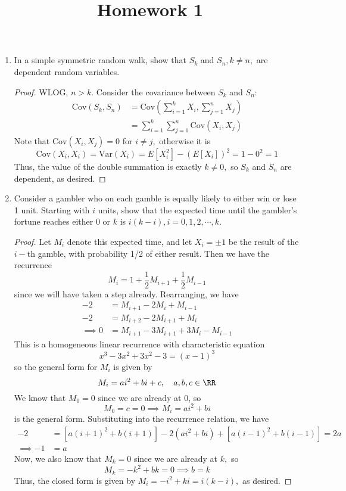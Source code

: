 \documentclass{article}
\newcommand{\var}{\mathrm{Var}}
\newcommand{\cov}{\mathrm{Cov}}
\begin{document}
\title{Homework 1}
\maketitle
\thispagestyle{fancy}

\begin{enumerate}
	\item In a simple symmetric random walk, show that $S_k$ and $S_n, k\neq n,$ are dependent random variables.
		\begin{proof}
			WLOG, $n>k.$ Consider the covariance between $S_k$ and $S_n:$
			\begin{align*}
				\cov(S_k, S_n) &= \cov\left( \sum_{i=1}^{k}X_i, \sum_{j=1}^{n} X_j \right) \\
				&= \sum_{i=1}^{k} \sum_{j=1}^{n} \cov(X_i, X_j)
			\end{align*}
			Note that $\cov(X_i, X_j)=0$ for $i\neq j,$ otherwise it is
			\[\cov(X_i, X_i)=\var(X_i)=E[X_i^2]-(E[X_i])^2 = 1 - 0^2 = 1\]
			Thus, the value of the double summation is exactly $k\neq 0,$ so $S_k$ and $S_n$ are dependent, as desired.
		\end{proof}

	\item Consider a gambler who on each gamble is equally likely to either win or lose 1 unit. Starting with $i$ units, show that the expected time until the gambler's fortune reaches either $0$ or $k$ is $i(k-i), i=0, 1, 2, \cdots, k.$
		\begin{proof}
			Let $M_i$ denote this expected time, and let $X_i=\pm 1$ be the result of the $i-$th gamble, with probability 1/2 of either result. Then we have the recurrence
			\[M_i=1+\frac{1}{2}M_{i+1}+\frac{1}{2}M_{i-1}\]
			since we will have taken a step already. Rearranging, we have
			\begin{align*}
				-2 &= M_{i+1}-2M_i+M_{i-1} \\
				-2 &= M_{i+2}-2M_{i+1}+M_i \\
				\implies 0 &= M_{i+1}-3M_{i+1}+3M_i-M_{i-1}
			\end{align*}
			This is a homogeneous linear recurrence with characteristic equation
			\[x^3-3x^2+3x^2-3 = (x-1)^3\]
			so the general form for $M_i$ is given by
			\[M_i= ai^2+bi+c, \quad a, b, c\in \RR\]
			We know that $M_0=0$ since we are already at 0, so
			\[M_0=c=0\implies M_i=ai^2+bi\]
			is the general form. Substituting into the recurrence relation, we have
			\begin{align*}
				-2 &= \left[ a(i+1)^2+b(i+1) \right] - 2\left( ai^2+bi \right) + \left[ a(i-1)^2+b(i-1) \right] = 2a \\
				\implies -1 &= a
			\end{align*}
			Now, we also know that $M_k=0$ since we are already at $k,$ so
			\[M_k=-k^2+bk=0\implies b=k\]
			Thus, the closed form is given by $M_i=-i^2+ki=i(k-i),$ as desired.
		\end{proof}


\end{enumerate}
\end{document}
